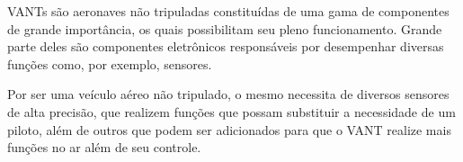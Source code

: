 VANTs são aeronaves não tripuladas constituídas de uma gama de componentes de grande importância, os quais possibilitam seu pleno funcionamento. Grande parte deles são componentes eletrônicos responsáveis por desempenhar diversas funções como, por exemplo, sensores.

Por ser uma veículo aéreo não tripulado, o mesmo necessita de diversos sensores de alta precisão, que realizem funções que possam substituir a necessidade de um piloto, além de outros que podem ser adicionados para que o VANT realize mais funções no ar além de seu controle.
